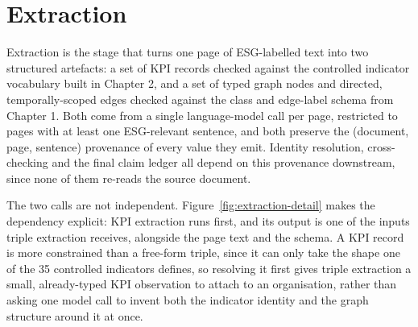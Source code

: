\documentclass[fontsize=12pt,oneside,headings=small]{scrreprt}
\begin{document}
\section{Extraction}
\label{sec:extraction}

Extraction is the stage that turns one page of ESG-labelled text into two structured artefacts: a set of KPI records checked against the controlled indicator vocabulary built in Chapter 2, and a set of typed graph nodes and directed, temporally-scoped edges checked against the class and edge-label schema from Chapter 1. Both come from a single language-model call per page, restricted to pages with at least one ESG-relevant sentence, and both preserve the (document, page, sentence) provenance of every value they emit. Identity resolution, cross-checking and the final claim ledger all depend on this provenance downstream, since none of them re-reads the source document.

The two calls are not independent. Figure~\ref{fig:extraction-detail} makes the dependency explicit: KPI extraction runs first, and its output is one of the inputs triple extraction receives, alongside the page text and the schema. A KPI record is more constrained than a free-form triple, since it can only take the shape one of the 35 controlled indicators defines, so resolving it first gives triple extraction a small, already-typed KPI observation to attach to an organisation, rather than asking one model call to invent both the indicator identity and the graph structure around it at once.
\end{document}
